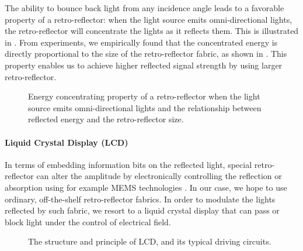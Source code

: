 The ability to bounce back light from any incidence angle leads to a favorable property of a retro-reflector: when the light source emits omni-directional lights, the retro-reflector will concentrate the lights as it reflects them. This is illustrated in . From experiments, we empirically found that the concentrated energy is directly proportional to the size of the retro-reflector fabric, as shown in . This property enables us to achieve higher reflected signal strength by using larger retro-reflector.
\begin{figure}[!th]
  \begin{center}
      \hfill
      \caption{Energy concentrating property of a retro-reflector when the light source emits omni-directional lights and the relationship between reflected energy and the retro-reflector size. }\label{fig:retro}
  \end{center}
\end{figure}


\paragraph{Liquid Crystal Display (LCD)}
In terms of embedding information bits on the reflected light, special retro-reflector can alter the amplitude by electronically controlling the reflection or absorption using for example MEMS technologies \cite{expensive,expensive2}. In our case, we hope to use ordinary, off-the-shelf retro-reflector fabrics. In order to modulate the lights reflected by such fabric, we resort to a liquid crystal display that can pass or block light under the control of electrical field. 


\begin{figure}[th]
  \begin{center}
      \hfill
      \caption{The structure and principle of LCD, and its typical driving circuits. }\label{fig:lcd}
  \end{center}
\end{figure}

